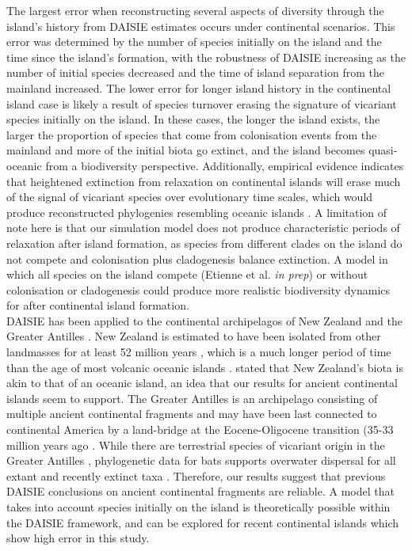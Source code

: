 \documentclass{article}
\begin{document}
The largest error when reconstructing several aspects of diversity through the island’s history from DAISIE estimates occurs under continental scenarios. This error was determined by the number of species initially on the island and the time since the island’s formation, with the robustness of DAISIE increasing as the number of initial species decreased and the time of island separation from the mainland increased. The lower error for longer island history in the continental island case is likely a result of species turnover erasing the signature of vicariant species initially on the island. In these cases, the longer the island exists, the larger the proportion of species that come from colonisation events from the mainland and more of the initial biota go extinct, and the island becomes quasi-oceanic from a biodiversity perspective. Additionally, empirical evidence indicates that heightened extinction from relaxation on continental islands will erase much of the signal of vicariant species over evolutionary time scales, which would produce reconstructed phylogenies resembling oceanic islands \citep{diamond_biogeographic_1972, halley_dynamics_2016}. A limitation of note here is that our simulation model does not produce characteristic periods of relaxation after island formation, as species from different clades on the island do not compete and colonisation plus cladogenesis balance extinction. A model in which all species on the island compete (Etienne et al. \textit{in prep}) or without colonisation or cladogenesis \citep{halley_neutral_2011} could produce more realistic biodiversity dynamics for after continental island formation.  \\

DAISIE has been applied to the continental archipelagos of New Zealand \citep{valente_deep_2019} and the Greater Antilles  \citep{valente_recent_2017}. New Zealand is estimated to have been isolated from other landmasses for at least 52 million years \citep{schellart_late_2006}, which is a much longer period of time than the age of most volcanic oceanic islands \citep{valente_simple_2020}. \cite{wallace_island_1880} stated that New Zealand’s biota is akin to that of an oceanic island, an idea that our results for ancient continental islands seem to support. The Greater Antilles is an archipelago consisting of multiple ancient continental fragments and may have been last connected to continental America by a land-bridge at the Eocene-Oligocene transition (35-33 million years ago \citep{iturralde_paleogeography_1999}. While there are terrestrial species of vicariant origin in the Greater Antilles \citep{brace_unexpected_2015}, phylogenetic data for bats supports overwater dispersal for all extant and recently extinct taxa \cite{valente_equilibrium_2017}. Therefore, our results suggest that previous DAISIE conclusions on ancient continental fragments are reliable. A model that takes into account species initially on the island is theoretically possible within the DAISIE framework, and can be explored for recent continental islands which show high error in this study. \\
\end{document}

